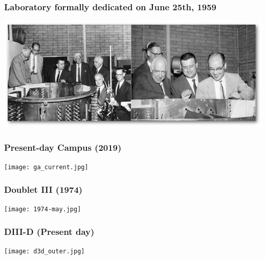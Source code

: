 \begin{frame}
  \frametitle{Laboratory formally dedicated on June 25th, 1959\\
  }
  \begin{center}
   \includegraphics[width=5.8in]{figures/ga1959.jpg}
  \end{center}
\end{frame}


\begin{frame}
  \frametitle{Present-day Campus (2019)\\
  }
  \begin{center}
   \vspace{-3mm}
    \texttt{[image: ga\_current.jpg]}
  \end{center}
\end{frame}


\begin{frame}
  \frametitle{Doublet III (1974)}
  \begin{center}
   \vspace{-4mm}
    \texttt{[image: 1974-may.jpg]}
  \end{center}
\end{frame}


\begin{frame}
  \frametitle{DIII-D (Present day)}
  \begin{center}
   \vspace{-3mm}
    \texttt{[image: d3d\_outer.jpg]}
  \end{center}
\end{frame}

